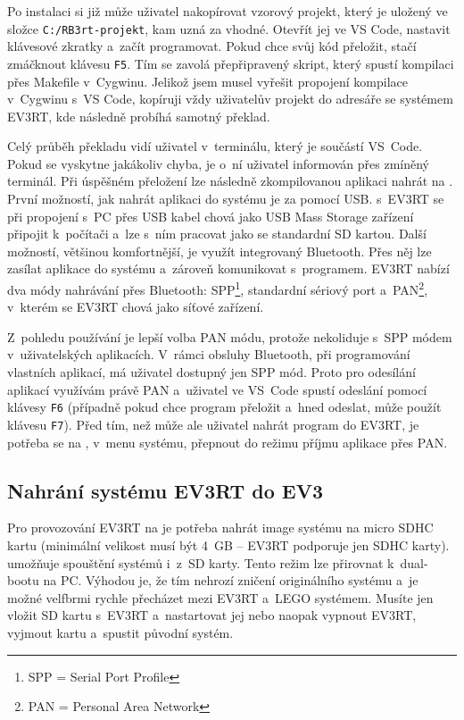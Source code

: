 Po instalaci si již může uživatel nakopírovat vzorový projekt, který je uložený ve složce \texttt{C:/RB3rt-projekt}, kam uzná za vhodné. 
Otevřít jej ve VS Code, nastavit klávesové zkratky a~začít programovat.
Pokud chce svůj kód přeložit, stačí zmáčknout klávesu \texttt{F5}. 
Tím se zavolá přepřipravený skript, který spustí kompilaci přes Makefile v~Cygwinu. 
Jelikož jsem musel vyřešit propojení kompilace v~Cygwinu s~VS Code, kopíruji vždy uživatelův projekt do adresáře se systémem EV3RT, kde následně probíhá samotný překlad.

Celý průběh překladu vidí uživatel v~terminálu, který je součástí VS~Code. 
Pokud se vyskytne jakákoliv chyba, je o~ní uživatel informován přes zmíněný terminál.
Při úspěšném přeložení lze následně zkompilovanou aplikaci nahrát na \EVbrick{}. 
První možností, jak nahrát aplikaci do systému je za pomocí USB. \brick{} s~EV3RT se při propojení s~PC přes USB kabel chová jako USB Mass Storage zařízení připojit k~počítači a~lze s~ním pracovat jako se standardní SD kartou.
Další možností, většinou komfortnější, je využít integrovaný Bluetooth. 
Přes něj lze zasílat aplikace do systému a~zároveň komunikovat s~programem. 
EV3RT nabízí dva módy nahrávání přes Bluetooth: SPP\footnote{SPP = Serial Port Profile}, standardní sériový port a~PAN\footnote{PAN = Personal Area Network}, v~kterém se EV3RT chová jako síťové zařízení.

Z~pohledu používání je lepší volba PAN módu, protože nekoliduje s~SPP módem v~uživatelských aplikacích. 
V~rámci obsluhy Bluetooth, při programování vlastních aplikací, má uživatel dostupný jen SPP mód.
Proto pro odesílání aplikací využívám právě PAN a~uživatel ve VS~Code spustí odeslání  pomocí klávesy \texttt{F6} (případně pokud chce program přeložit a~hned odeslat, může použít klávesu \texttt{F7}).
Před tím, než může ale uživatel nahrát program do EV3RT, je potřeba se na , v~menu systému, přepnout do režimu příjmu aplikace přes PAN.

\subsection{Nahrání systému EV3RT do EV3}

Pro provozování EV3RT na  je potřeba nahrát image systému na micro SDHC kartu (minimální velikost musí být 4~GB -- EV3RT podporuje jen SDHC karty).
\EVbrick{} umožňuje spouštění systémů i~z~SD karty. Tento režim lze přirovnat k~dual-bootu na PC. 
Výhodou je, že tím nehrozí zničení originálního systému a~je možné velfbrmi rychle přecházet mezi EV3RT a~LEGO systémem. 
Musíte jen vložit SD kartu s~EV3RT a~nastartovat jej nebo naopak vypnout EV3RT, vyjmout kartu a~spustit původní systém.

